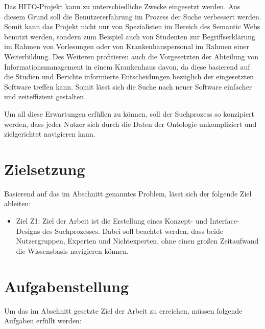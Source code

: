 Das HITO-Projekt kann zu unterschiedliche Zwecke eingesetzt werden. Aus diesem Grund soll die Benutzererfahrung im Prozess der Suche verbessert werden. Somit kann das Projekt nicht nur von Spezialisten im Bereich des Semantic Webs benutzt werden, sondern zum Beispiel auch von Studenten zur Begriffserklärung im Rahmen von Vorlesungen oder von Krankenhauspersonal im Rahmen einer Weiterbildung. Des Weiteren profitieren auch die Vorgesetzten der Abteilung von Informationsmanagement in einem Krankenhaus davon, da diese basierend auf die Studien und Berichte informierte Entscheidungen bezüglich der eingesetzten Software treffen kann. Somit lässt sich die Suche nach neuer Software einfacher und zeiteffizient gestalten.

Um all diese Erwartungen erfüllen zu können, soll der Suchprozess so konzipiert werden, dass jeder Nutzer sich durch die Daten der Ontologie unkompliziert und zielgerichtet navigieren kann.

\section{Zielsetzung}\label{sec:zielsetzung}

Basierend auf das im Abschnitt  genanntes Problem, lässt sich der folgende Ziel ableiten:

\begin{itemize}
\item Ziel Z1: Ziel der Arbeit ist die Erstellung eines Konzept- und Interface-Designs des Suchprozesses. 
Dabei soll beachtet werden, dass beide Nutzergruppen, Experten und Nichtexperten, ohne einen großen Zeitaufwand die Wissensbasis navigieren können.
\end{itemize}

\section{Aufgabenstellung}\label{sec:aufgabenstellung}

Um das im Abschnitt  gesetzte Ziel der Arbeit zu erreichen, müssen folgende Aufgaben erfüllt werden:

